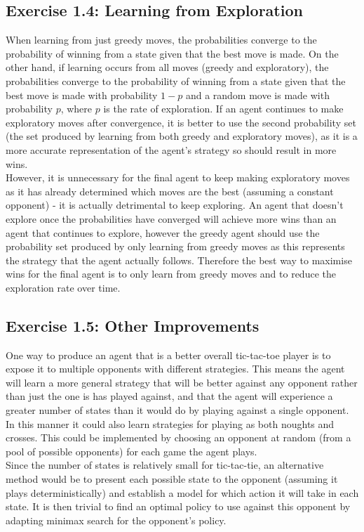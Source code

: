 \subsection*{Exercise 1.4: Learning from Exploration}

When learning from just greedy moves, the probabilities converge to the probability of winning from a state given that the best move is made. On the other hand, if learning occurs from all moves (greedy and exploratory), the probabilities converge to the probability of winning from a state given that the best move is made with probability $1-p$ and a random move is made with probability $p$, where $p$ is the rate of exploration. If an agent continues to make exploratory moves after convergence, it is better to use the second probability set (the set produced by learning from both greedy and exploratory moves), as it is a more accurate representation of the agent's strategy so should result in more wins. \\

However, it is unnecessary for the final agent to keep making exploratory moves as it has already determined which moves are the best (assuming a constant opponent) - it is actually detrimental to keep exploring. An agent that doesn't explore once the probabilities have converged will achieve more wins than an agent that continues to explore, however the greedy agent should use the probability set produced by only learning from greedy moves as this represents the strategy that the agent actually follows. Therefore the best way to maximise wins for the final agent is to only learn from greedy moves and to reduce the exploration rate over time.

\subsection*{Exercise 1.5: Other Improvements}

One way to produce an agent that is a better overall tic-tac-toe player is to expose it to multiple opponents with different strategies. This means the agent will learn a more general strategy that will be better against any opponent rather than just the one is has played against, and that the agent will experience a greater number of states than it would do by playing against a single opponent. In this manner it could also learn strategies for playing as both noughts and crosses. This could be implemented by choosing an opponent at random (from a pool of possible opponents) for each game the agent plays. \\

Since the number of states is relatively small for tic-tac-tie, an alternative method would be to present each possible state to the opponent (assuming it plays deterministically) and establish a model for which action it will take in each state. It is then trivial to find an optimal policy to use against this opponent by adapting minimax search for the opponent's policy. 

